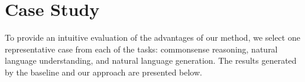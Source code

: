 

\section{Case Study}
\label{appendix:case_study}
To provide an intuitive evaluation of the advantages of our method, we select one representative case from each of the tasks: commonsense reasoning, natural language understanding, and natural language generation.
The results generated by the baseline and our approach are presented below.







